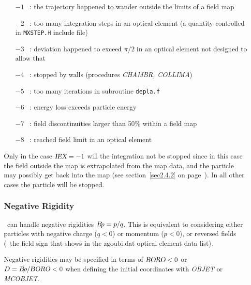 \begin{itemize}
\item[$-1$]~:  the trajectory happened to wander outside the limits of a field map 
\item[$-2$]~:  too many integration steps in an optical element (a quantity controlled in 
\texttt{MXSTEP.H} include file)
\item[$-3$]~:  deviation happened to exceed $\pi / 2 $ in an optical element not designed to allow that
\item[$-4$]~:  stopped by walls (procedures \textsl{CHAMBR, COLLIMA})  
\item[$-5$]~:  too many iterations in subroutine \texttt{depla.f}  
\item[$-6$]~:  energy loss exceeds particle energy 
\item[$-7$]~:  field discontinuities larger than 50\% within a field map
\item[$-8$]~:  reached field limit in an optical element
\end{itemize}


\noindent Only in the case $\textsl{IEX}=-1$ will the integration not be stopped since in this case 
the field outside the map is extrapolated from the map data, and the particle may possibly get 
back into the map (see section~\ref{sec2.4.2} on page~\pageref{sec2.4.2}).  In all other cases 
  the particle will be stopped. 

\subsubsection{Negative Rigidity} \label{sec4.6.7}   

\zgou\ can handle negative rigidities $B\!\rho = p/q$. This is equivalent to 
considering either particles with negative charge ($q<0$) or
momentum ($p<0$), or  reversed fields (\wrt~the field sign 
that shows in the zgoubi.dat optical element data list).

\noindent Negative rigidities may be specified in terms of 
$\textsl{BORO} <0$ or $D=B\!\rho / \textsl{BORO} < 0$ when 
defining the initial coordinates with \textsl{OBJET} or \textsl{MCOBJET}.
